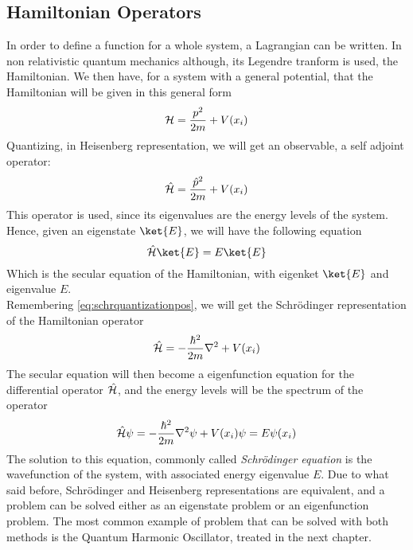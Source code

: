 \documentclass[../qm.tex]{subfiles}
\begin{document}
	\subsection{Hamiltonian Operators}
	In order to define a function for a whole system, a Lagrangian can be written. In non relativistic quantum mechanics although, its Legendre tranform is used, the Hamiltonian. We then have, for a system with a general potential, that the Hamiltonian will be given in this general form
	\begin{equation}
		\mathcal{H}=\frac{p^2}{2m}+V(x_i)
		\label{eq:hamiltonianclass}
	\end{equation}
	Quantizing, in Heisenberg representation, we will get an observable, a self adjoint operator:
	\begin{equation}
		\hat{\mathcal{H}}=\frac{\hat{p}^2}{2m}+V(x_i)
		\label{eq:quantumham}
	\end{equation}
	This operator is used, since its eigenvalues are the energy levels of the system.\\
	Hence, given an eigenstate $\ket{E}$, we will have the following equation
	\begin{equation}
		\opr{\ham}\ket{E}=E\ket{E}
		\label{eq:seculareqham}
	\end{equation}
	Which is the secular equation of the Hamiltonian, with eigenket $\ket{E}$ and eigenvalue $E$.\\
	Remembering \eqref{eq:schrquantizationpos}, we will get the Schrödinger representation of the Hamiltonian operator
	\begin{equation}
		\hat{\mathcal{H}}=-\frac{\hbar^2}{2m}\nabla^2+V(x_i)
		\label{eq:schrham}
	\end{equation}
	The secular equation will then become a eigenfunction equation for the differential operator $\hat{\mathcal{H}}$, and the energy levels will be the spectrum of the operator
	\begin{equation}
		\hat{\mathcal{H}}\psi=-\frac{\hbar^2}{2m}\nabla^2\psi+V(x_i)\psi=E\psi(x_i)
		\label{eq:schreigfun}
	\end{equation}
	The solution to this equation, commonly called \textit{Schrödinger equation} is the wavefunction of the system, with associated energy eigenvalue $E$. Due to what said before, Schrödinger and Heisenberg representations are equivalent, and a problem can be solved either as an eigenstate problem or an eigenfunction problem. The most common example of problem that can be solved with both methods is the Quantum Harmonic Oscillator, treated in the next chapter.\\
\end{document}

